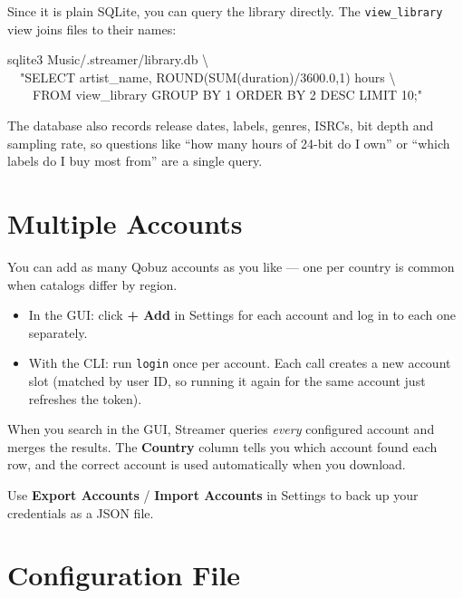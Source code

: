 \documentclass[11pt,a4paper]{article}
\begin{document}
Since it is plain SQLite, you can query the library directly.  The
\texttt{view\_library} view joins files to their names:

\begin{cmdbox}
sqlite3 Music/.streamer/library.db \textbackslash{}\\
~~"SELECT artist\_name, ROUND(SUM(duration)/3600.0,1) hours \textbackslash{}\\
~~~~FROM view\_library GROUP BY 1 ORDER BY 2 DESC LIMIT 10;"
\end{cmdbox}

The database also records release dates, labels, genres, ISRCs, bit depth and
sampling rate, so questions like ``how many hours of 24-bit do I own'' or
``which labels do I buy most from'' are a single query.

\section{Multiple Accounts}

You can add as many Qobuz accounts as you like --- one per country is common
when catalogs differ by region.

\begin{itemize}
  \item In the GUI: click \textbf{+ Add} in Settings for each account and log
        in to each one separately.
  \item With the CLI: run \texttt{login} once per account.  Each call creates
        a new account slot (matched by user ID, so running it again for the
        same account just refreshes the token).
\end{itemize}

When you search in the GUI, Streamer queries \emph{every} configured account
and merges the results.  The \textbf{Country} column tells you which account
found each row, and the correct account is used automatically when you download.

Use \textbf{Export Accounts} / \textbf{Import Accounts} in Settings to back
up your credentials as a JSON file.

\section{Configuration File}
\end{document}

